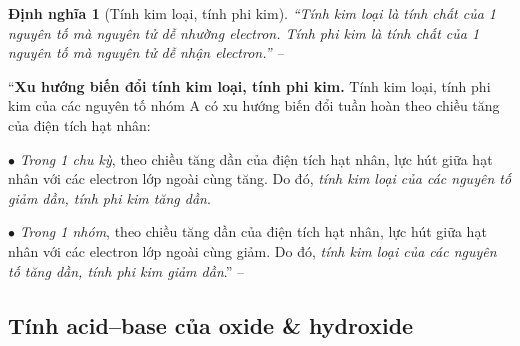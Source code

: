 \documentclass[oneside]{book}
\numberwithin{equation}{section}
\newtheorem{dinhnghia}{Định nghĩa}[section]
\begin{document}
\begin{dinhnghia}[Tính kim loại, tính phi kim]
	``\emph{Tính kim loại} là tính chất của 1 nguyên tố mà nguyên tử dễ nhường electron. \emph{Tính phi kim} là tính chất của 1 nguyên tố mà nguyên tử dễ nhận electron.'' -- \cite[p. 45]{SGK_Hoa_Hoc_10_Chan_Troi_Sang_Tao}
\end{dinhnghia}
``\textbf{Xu hướng biến đổi tính kim loại, tính phi kim.} Tính kim loại, tính phi kim của các nguyên tố nhóm A có xu hướng biến đổi tuần hoàn theo chiều tăng của điện tích hạt nhân:
\begin{enumerate*}
	\item[$\bullet$] \textit{Trong 1 chu kỳ}, theo chiều tăng dần của điện tích hạt nhân, lực hút giữa hạt nhân với các electron lớp ngoài cùng tăng. Do đó, \textit{tính kim loại của các nguyên tố giảm dần, tính phi kim tăng dần}.
	\item[$\bullet$] \textit{Trong 1 nhóm}, theo chiều tăng dần của điện tích hạt nhân, lực hút giữa hạt nhân với các electron lớp ngoài cùng giảm. Do đó, \textit{tính kim loại của các nguyên tố tăng dần, tính phi kim giảm dần}.'' -- \cite[p. 46]{SGK_Hoa_Hoc_10_Chan_Troi_Sang_Tao}
\end{enumerate*}

\subsection{Tính acid--base của oxide \& hydroxide}
\end{document}
